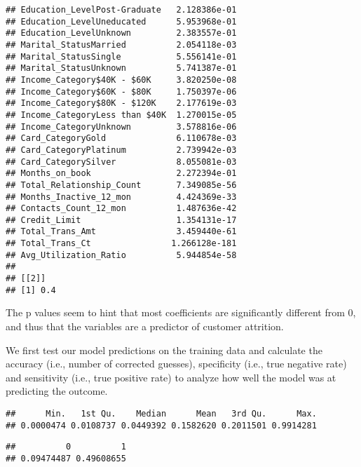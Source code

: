\documentclass[
]{article}
\newenvironment{Shaded}{\begin{snugshade}}{\end{snugshade}}
\newcommand{\CommentTok}[1]{\textcolor[rgb]{0.56,0.35,0.01}{\textit{#1}}}
\newcommand{\FloatTok}[1]{\textcolor[rgb]{0.00,0.00,0.81}{#1}}
\newcommand{\FunctionTok}[1]{\textcolor[rgb]{0.00,0.00,0.00}{#1}}
\newcommand{\NormalTok}[1]{#1}
\newcommand{\OtherTok}[1]{\textcolor[rgb]{0.56,0.35,0.01}{#1}}
\newcommand{\SpecialCharTok}[1]{\textcolor[rgb]{0.00,0.00,0.00}{#1}}
\begin{document}
\begin{verbatim}
## Education_LevelPost-Graduate   2.128386e-01
## Education_LevelUneducated      5.953968e-01
## Education_LevelUnknown         2.383557e-01
## Marital_StatusMarried          2.054118e-03
## Marital_StatusSingle           5.556141e-01
## Marital_StatusUnknown          5.741387e-01
## Income_Category$40K - $60K     3.820250e-08
## Income_Category$60K - $80K     1.750397e-06
## Income_Category$80K - $120K    2.177619e-03
## Income_CategoryLess than $40K  1.270015e-05
## Income_CategoryUnknown         3.578816e-06
## Card_CategoryGold              6.110678e-03
## Card_CategoryPlatinum          2.739942e-03
## Card_CategorySilver            8.055081e-03
## Months_on_book                 2.272394e-01
## Total_Relationship_Count       7.349085e-56
## Months_Inactive_12_mon         4.424369e-33
## Contacts_Count_12_mon          1.487636e-42
## Credit_Limit                   1.354131e-17
## Total_Trans_Amt                3.459440e-61
## Total_Trans_Ct                1.266128e-181
## Avg_Utilization_Ratio          5.944854e-58
## 
## [[2]]
## [1] 0.4
\end{verbatim}

The p values seem to hint that most coefficients are significantly
different from 0, and thus that the variables are a predictor of
customer attrition.

We first test our model predictions on the training data and calculate
the accuracy (i.e., number of corrected guesses), specificity (i.e.,
true negative rate) and sensitivity (i.e., true positive rate) to
analyze how well the model was at predicting the outcome.

\begin{verbatim}
##      Min.   1st Qu.    Median      Mean   3rd Qu.      Max. 
## 0.0000474 0.0108737 0.0449392 0.1582620 0.2011501 0.9914281
\end{verbatim}

\begin{verbatim}
##          0          1 
## 0.09474487 0.49608655
\end{verbatim}

\begin{Shaded}
\end{Shaded}
\end{document}
